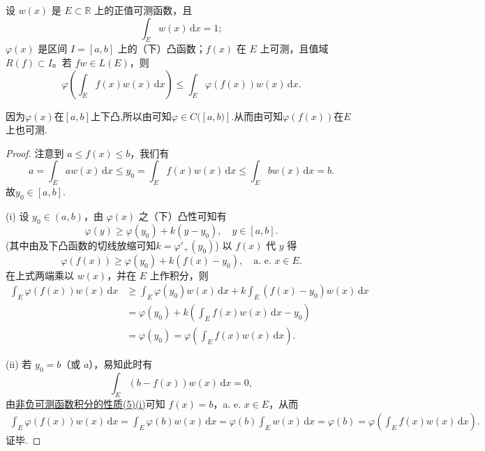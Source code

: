 \documentclass[../../main.tex]{subfiles}%
\begin{document}
\begin{theorem}[Jensen不等式]\label{theorem:Jensen不等式}
设 $w(x)$ 是 $E \subset \mathbb{R}$ 上的正值可测函数，且
\[
\int_E w(x) \, \mathrm{d}x = 1;
\]
$\varphi(x)$ 是区间 $I = [a,b]$ 上的（下）凸函数；$f(x)$ 在 $E$ 上可测，且值域 $R(f) \subset I$。若 $fw \in L(E)$，则
\[
\varphi\left( \int_E f(x)w(x) \, \mathrm{d}x \right) \leqslant \int_E \varphi(f(x))w(x) \, \mathrm{d}x.
\]
\end{theorem}
\begin{remark}
因为$\varphi(x)$在$[a,b]$上下凸,所以由可知$\varphi \in C([a,b)]$.从而由可知$\varphi(f(x))$在$E$上也可测.
\end{remark}
\begin{proof}
注意到 $a \leqslant f(x) \leqslant b$，我们有
\[
a=\int_E{aw(x)\,\mathrm{d}x}\leqslant y_0=\int_E{f(x)w(x)\,\mathrm{d}x}\leqslant \int_E{bw(x)\,\mathrm{d}x}=b.
\]
故$y_0\in[a,b]$.

(i) 设 $y_0 \in (a,b)$，由 $\varphi(x)$ 之（下）凸性可知有
\[
\varphi(y) \geqslant \varphi(y_0) + k(y - y_0), \quad y \in [a,b].
\]
(其中由及下凸函数的切线放缩可知$k=\varphi'_+(y_0)$)
以 $f(x)$ 代 $y$ 得
\[
\varphi(f(x)) \geqslant \varphi(y_0) + k(f(x) - y_0), \quad \text{a. e. } x \in E.
\]
在上式两端乘以 $w(x)$，并在 $E$ 上作积分，则
\begin{align*}
\int_E \varphi(f(x))w(x) \, \mathrm{d}x &\geqslant \int_E \varphi(y_0)w(x) \, \mathrm{d}x + k \int_E (f(x) - y_0)w(x) \, \mathrm{d}x \\
&= \varphi(y_0) + k \left( \int_E f(x)w(x) \, \mathrm{d}x - y_0 \right) \\
&= \varphi(y_0) = \varphi\left( \int_E f(x)w(x) \, \mathrm{d}x \right).
\end{align*}

(ii) 若 $y_0 = b$（或 $a$），易知此时有
\[
\int_E (b - f(x))w(x) \, \mathrm{d}x = 0,
\]
由\hyperref[theorem:非负可测函数积分的性质]{非负可测函数积分的性质(5)(i)}可知 $f(x) = b$，a. e. $x \in E$，从而
\begin{align*}
\int_E \varphi(f(x))w(x) \, \mathrm{d}x = \int_E \varphi(b)w(x) \, \mathrm{d}x 
= \varphi(b) \int_E w(x) \, \mathrm{d}x = \varphi(b) 
= \varphi\left( \int_E f(x)w(x) \, \mathrm{d}x \right).
\end{align*}
证毕.
\end{proof}
\end{document}

